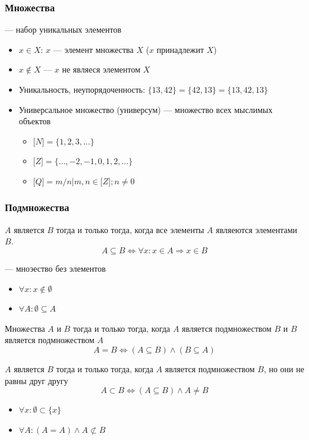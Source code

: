 \documentclass[a4paper, 14pt]{extarticle}
\begin{document}
\subsubsection*{Множества}
 --- набор уникальных элементов
\begin{itemize}
    \item $x\in X$: $x$ --- элемент множества $X$ ($x$ принадлежит $X$)
    \item $x \notin X$ --- $x$ не являеся элементом $X$
    \item Уникальность, неупорядоченность: $\{13, 42\} = \{42, 13\} = \{13, 42, 13 \}$
    \item Универсальное множество (универсум) --- множество всех мыслимых объектов
    \begin{itemize}
        \item $ \mathbb[N] = \{ 1, 2, 3, \ldots \} $
        \item $ \mathbb[Z] = \{ \ldots, -2, -1, 0, 1, 2, \ldots \} $
        \item $ \mathbb[Q] = { m/n | m, n \in \mathbb[Z]; n \ne 0} $
    \end{itemize}
\end{itemize}

\subsubsection*{Подмножества}
$A$ является  $B$ тогда и только тогда, когда все элементы $A$ являеются элементами $B$.
\[ A \subseteq B \Longleftrightarrow \forall x: x \in A \Rightarrow x \in B \]

 --- мноэество без элементов
\begin{itemize}
    \item $ \forall x: x \notin \emptyset $
    \item $ \forall A: \emptyset \subseteq A $
\end{itemize}

Множества $A$ и $B$  тогда и только тогда, когда $A$ является подмножеством $B$ и $B$ является подмножеством $A$
\[ A = B \Longleftrightarrow (A \subseteq B) \wedge (B \subseteq A) \]

$A$ является  $B$ тогда и только тогда, когда $A$ является подмножеством $B$, но они не равны друг другу
\[ A \subset B \Longleftrightarrow (A \subseteq B) \wedge A \ne B \]
\begin{itemize}
    \item $ \forall x: \emptyset \subset \{ x \} $
    \item $ \forall A: (A = A) \wedge A \not\subset B $ 
\end{itemize}
\end{document}
